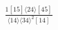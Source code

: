 \documentclass[varwidth, border=5pt]{standalone}
\begin{document}
\begin{my}
$\begin{gathered}
\scriptscriptstyle\frac{1[15]⟨24⟩[45]}{⟨14⟩⟨34⟩^2[14]}
\end{gathered}$
\end{my}
\end{document}
